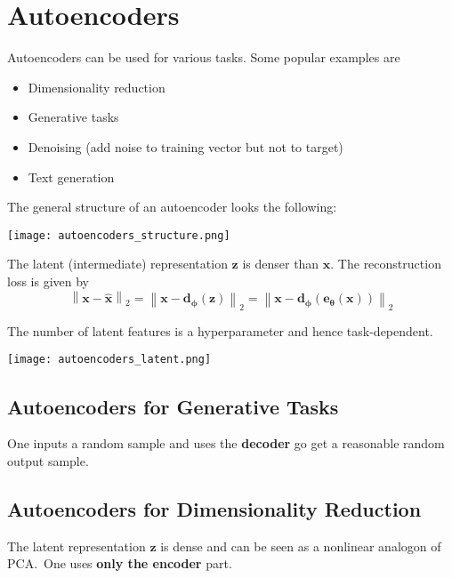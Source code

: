 \section{Autoencoders}
Autoencoders can be used for various tasks. Some popular examples are
\begin{itemize}
    \item Dimensionality reduction
    \item Generative tasks
    \item Denoising (add noise to training vector but not to target)
    \item Text generation
\end{itemize}
The general structure of an autoencoder looks the following:
\begin{center}
    \texttt{[image: autoencoders\_structure.png]}
\end{center}
The latent (intermediate) representation $\mathbf{z}$ is denser than $\mathbf{x}$. The reconstruction loss is given by
\begin{equation*}
    \left\|\mathbf{x}-\hat{\mathbf{x}}\right\|_2=\left\|\mathbf{x}-\mathbf{d_\phi}(\mathbf{z})\right\|_2=\left\|\mathbf{x}-\mathbf{d_\phi}(\mathbf{e_\theta}(\mathbf{x}))\right\|_2
\end{equation*}

\newpar{}

The number of latent features is a hyperparameter and hence task-dependent.
\begin{center}
    \texttt{[image: autoencoders\_latent.png]}
\end{center}

\subsection{Autoencoders for Generative Tasks}
One inputs a random sample and uses the \textbf{decoder} go get a reasonable random output sample.

\subsection{Autoencoders for Dimensionality Reduction}
The latent representation $\mathbf{z}$ is dense and can be seen as a nonlinear analogon of PCA.\ One uses \textbf{only the encoder} part.

